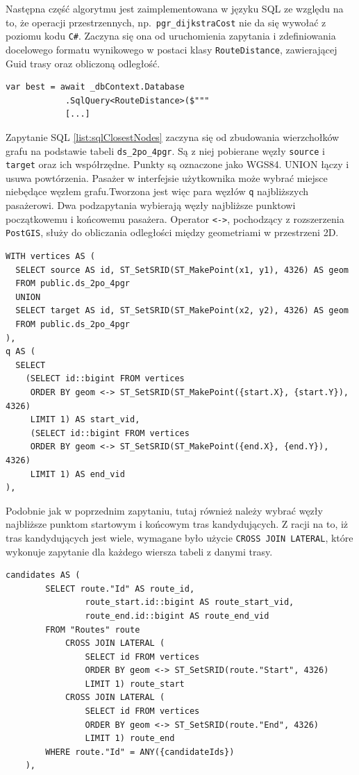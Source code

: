 Następna część algorytmu jest zaimplementowana w języku SQL ze względu na to, że operacji przestrzennych, np.\ \texttt{pgr\_dijkstraCost} nie da się wywołać z poziomu kodu \texttt{C\#}.
Zaczyna się ona od uruchomienia zapytania i zdefiniowania docelowego formatu wynikowego w postaci klasy \texttt{RouteDistance}, zawierającej Guid trasy oraz obliczoną odległość.
\begin{lstlisting}[label=list:sqlStart,caption=Uruchomienie zapytania SQL,style=sharpcstyle]
    var best = await _dbContext.Database
            .SqlQuery<RouteDistance>($"""
            [...]
\end{lstlisting}
Zapytanie SQL \ref{list:sqlClosestNodes} zaczyna się od zbudowania wierzchołków grafu na podstawie tabeli \texttt{ds\_2po\_4pgr}. 
Są z niej pobierane węzły \texttt{source} i \texttt{target} oraz ich współrzędne. Punkty są oznaczone jako WGS84. UNION łączy i usuwa powtórzenia.
Pasażer w interfejsie użytkownika może wybrać miejsce niebędące węzłem grafu.Tworzona jest więc para węzłów \texttt{q} najbliższych pasażerowi. 
Dwa podzapytania wybierają węzły najbliższe punktowi początkowemu i końcowemu pasażera. 
Operator \texttt{<->}, pochodzący z rozszerzenia \texttt{PostGIS}, służy do obliczania odległości między geometriami w przestrzeni 2D.
\begin{lstlisting}[label=list:sqlClosestNodes,caption=Wybór węzłów najbliższych punktom pasażera,style=sqlstyle]
WITH vertices AS (
  SELECT source AS id, ST_SetSRID(ST_MakePoint(x1, y1), 4326) AS geom
  FROM public.ds_2po_4pgr
  UNION
  SELECT target AS id, ST_SetSRID(ST_MakePoint(x2, y2), 4326) AS geom
  FROM public.ds_2po_4pgr
),
q AS (
  SELECT
    (SELECT id::bigint FROM vertices
     ORDER BY geom <-> ST_SetSRID(ST_MakePoint({start.X}, {start.Y}), 4326)
     LIMIT 1) AS start_vid,
     (SELECT id::bigint FROM vertices
     ORDER BY geom <-> ST_SetSRID(ST_MakePoint({end.X}, {end.Y}), 4326)
     LIMIT 1) AS end_vid
),
\end{lstlisting}
Podobnie jak w poprzednim zapytaniu, tutaj również należy wybrać węzły najbliższe punktom startowym i końcowym tras kandydujących.
Z racji na to, iż tras kandydujących jest wiele, wymagane było użycie \texttt{CROSS JOIN LATERAL}, które wykonuje zapytanie dla każdego wiersza tabeli z danymi trasy.
\begin{lstlisting}[label=list:sqlClosestRouteNodes,caption=Wybór węzłów najbliższych punktom tras,style=sqlstyle]
    candidates AS (
        SELECT route."Id" AS route_id,
                route_start.id::bigint AS route_start_vid,
                route_end.id::bigint AS route_end_vid
        FROM "Routes" route
            CROSS JOIN LATERAL (
                SELECT id FROM vertices
                ORDER BY geom <-> ST_SetSRID(route."Start", 4326)
                LIMIT 1) route_start
            CROSS JOIN LATERAL (
                SELECT id FROM vertices
                ORDER BY geom <-> ST_SetSRID(route."End", 4326)
                LIMIT 1) route_end
        WHERE route."Id" = ANY({candidateIds})
    ),
\end{lstlisting}
